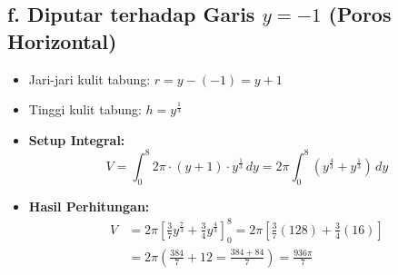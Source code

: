 \documentclass[12pt,a4paper]{article}
\begin{document}
\subsection*{f. Diputar terhadap Garis $y = -1$ (Poros Horizontal)}
\begin{itemize}
  \item Jari-jari kulit tabung: $r = y - (-1) = y + 1$
  \item Tinggi kulit tabung: $h = y^{\frac{1}{3}}$
  \item \textbf{Setup Integral:}
    \begin{equation*}
      V = \int_{0}^{8} 2\pi \cdot (y + 1) \cdot y^{\frac{1}{3}} \, dy = 2\pi \int_{0}^{8} (y^{\frac{4}{3}} + y^{\frac{1}{3}}) \, dy
    \end{equation*}
  \item \textbf{Hasil Perhitungan:}
    \begin{align*}
      V &= 2\pi \left[ \frac{3}{7}y^{\frac{7}{3}} + \frac{3}{4}y^{\frac{4}{3}} \right]_{0}^{8} = 2\pi \left[ \frac{3}{7}(128) + \frac{3}{4}(16) \right] \\
      &= 2\pi \left( \frac{384}{7} + 12 = \frac{384 + 84}{7} \right) = \frac{936\pi}{7}
    \end{align*}
\end{itemize}
\end{document}
